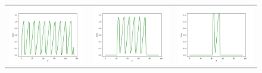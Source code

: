 \begin{figure}
	\centering
	\begin{tabular}{ccc}
		\includegraphics[scale=0.27]{learning/img/burger_predict_full0.png} &
		\includegraphics[scale=0.27]{learning/img/burger_predict_full10.png} &
		\includegraphics[scale=0.27]{learning/img/burger_predict_full20.png}

\end{tabular}
\end{figure}
